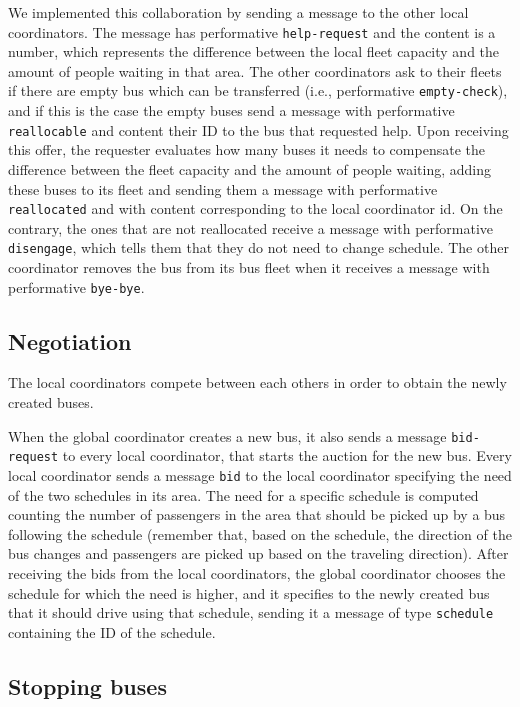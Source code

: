 We implemented this collaboration by sending a message to the other local coordinators. The message has performative \texttt{help-request} and the content is a number, which represents the difference between the local fleet capacity and the amount of people waiting in that area. The other coordinators ask to their fleets if there are empty bus which can be transferred (i.e., performative \texttt{empty-check}), and if this is the case the empty buses send a message with performative \texttt{reallocable} and content their ID to the bus that requested help. Upon receiving this offer, the requester evaluates how many buses it needs to compensate the difference between the fleet capacity and the amount of people waiting, adding these buses to its fleet and sending them a message with performative \texttt{reallocated} and with content corresponding to the local coordinator id. On the contrary, the ones that are not reallocated receive a message with performative \texttt{disengage}, which tells them that they do not need to change schedule. The other coordinator removes the bus from its bus fleet when it receives a message with performative \texttt{bye-bye}.

\subsection{Negotiation}
\label{subsec:negotiations}

The local coordinators compete between each others in order to obtain the newly created buses.

When the global coordinator creates a new bus, it also sends a message \texttt{bid-request} to every local coordinator, that starts the auction for the new bus. Every local coordinator sends a message \texttt{bid} to the local coordinator specifying the need of the two schedules in its area. The need for a specific schedule is computed counting the number of passengers in the area that should be picked up by a bus following the schedule (remember that, based on the schedule, the direction of the bus changes and passengers are picked up based on the traveling direction). After receiving the bids from the local coordinators, the global coordinator chooses the schedule for which the need is higher, and it specifies to the newly created bus that it should drive using that schedule, sending it a message of type \texttt{schedule} containing the ID of the schedule.

\subsection{Stopping buses}
\label{sec:stop}

